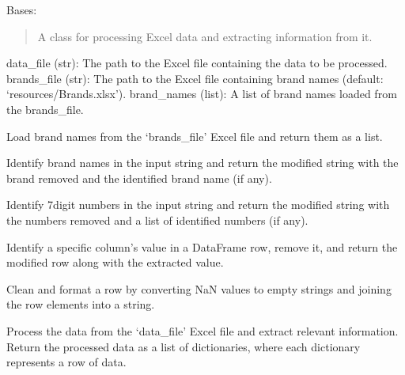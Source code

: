 \documentclass[letterpaper,10pt,english]{sphinxmanual}
\begin{document}
\begin{fulllineitems}
\label{\detokenize{excelidentify:excelidentify.ExcelManip}}
\pysigstartsignatures
{}
\pysigstopsignatures
\sphinxAtStartPar
Bases: 
\begin{quote}

\sphinxAtStartPar
A class for processing Excel data and extracting information from it.
\end{quote}
\begin{description}
\sphinxAtStartPar
data\_file (str): The path to the Excel file containing the data to be processed.
brands\_file (str): The path to the Excel file containing brand names (default: ‘resources/Brands.xlsx’).
brand\_names (list): A list of brand names loaded from the brands\_file.

\begin{description}
\sphinxAtStartPar
Load brand names from the ‘brands\_file’ Excel file and return them as a list.

\sphinxAtStartPar
Identify brand names in the input string and return the modified string with the brand removed
and the identified brand name (if any).

\sphinxAtStartPar
Identify 7\sphinxhyphen{}digit numbers in the input string and return the modified string with the numbers removed
and a list of identified numbers (if any).

\sphinxAtStartPar
Identify a specific column’s value in a DataFrame row, remove it, and return the modified row
along with the extracted value.

\sphinxAtStartPar
Clean and format a row by converting NaN values to empty strings and joining the row elements into a string.

\sphinxAtStartPar
Process the data from the ‘data\_file’ Excel file and extract relevant information.
Return the processed data as a list of dictionaries, where each dictionary represents a row of data.


\end{description}
\end{description}
\end{fulllineitems}
\end{document}
